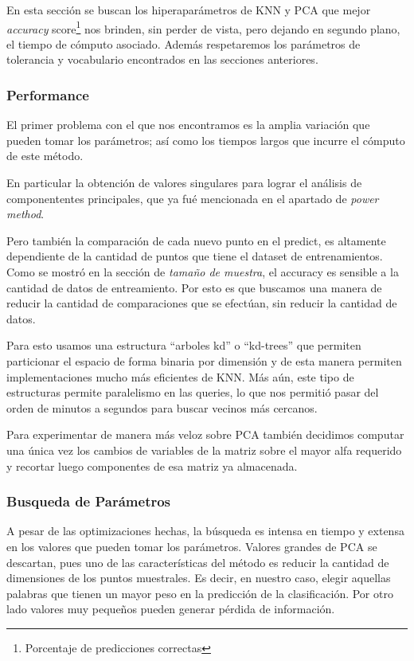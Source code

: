 En esta sección se buscan los hiperaparámetros de KNN y PCA que mejor
\emph{accuracy} score\footnote{Porcentaje de predicciones correctas} nos brinden, sin perder de vista, pero dejando en segundo
plano, el tiempo de cómputo asociado. Además respetaremos los
parámetros de tolerancia y vocabulario encontrados en las secciones
anteriores.

\subsubsection{Performance}

El primer problema con el que nos encontramos es la amplia variación
que pueden tomar los parámetros; así como los tiempos largos que
incurre el cómputo de este método.

En particular la obtención de valores singulares para lograr el
análisis de componententes principales, que ya fué mencionada en el
apartado de \emph{power method}.

Pero también la comparación de cada nuevo punto en el predict, es
altamente dependiente de la cantidad de puntos que tiene el dataset de
entrenamientos. Como se mostró en la sección de \emph{tamaño de
  muestra}, el accuracy es sensible a la cantidad de datos de
entreamiento. Por esto es que buscamos una manera de reducir la
cantidad de comparaciones que se efectúan, sin reducir la cantidad de
datos.

Para esto usamos una estructura ``arboles kd'' o ``kd-trees'' que
permiten particionar el espacio de forma binaria por dimensión y de
esta manera permiten implementaciones mucho más eficientes de KNN. Más aún, este
tipo de estructuras permite paralelismo en las queries, lo que nos permitió
pasar del orden de minutos a segundos para buscar vecinos más cercanos.

Para experimentar de manera más veloz sobre PCA también decidimos computar una
única vez los cambios de variables de la matriz sobre el mayor alfa requerido
y recortar luego componentes de esa matriz ya almacenada.

\subsubsection{Busqueda de Parámetros}

A pesar de las optimizaciones hechas, la búsqueda es intensa en tiempo
y extensa en los valores que pueden tomar los parámetros. Valores
grandes de PCA se descartan, pues uno de las características del
método es reducir la cantidad de dimensiones de los puntos
muestrales. Es decir, en nuestro caso, elegir aquellas palabras que
tienen un mayor peso en la predicción de la clasificación. Por otro
lado valores muy pequeños pueden generar pérdida de información.

